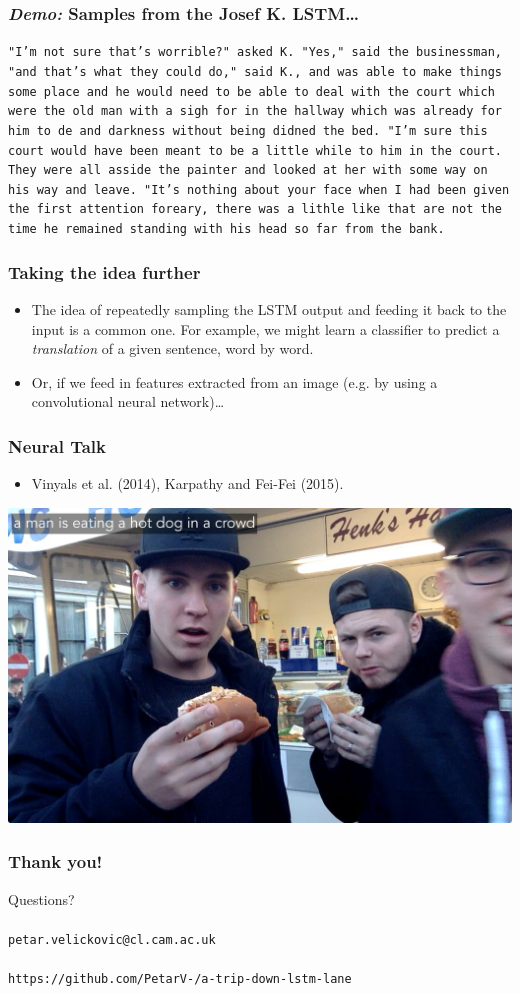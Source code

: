 \documentclass{beamer}
\begin{document}
\begin{frame}
	\frametitle{\emph{Demo:} Samples from the Josef K. LSTM\dots}
	{\tt "I'm not sure that's
worrible?" asked K.  "Yes," said the businessman, "and that's what they could do," said K., and was able to make things some place and he would need to be able to deal with the court which were the old man with a sigh for in the hallway which was already for him to de and darkness without being didned the bed.  "I'm sure this court would have been meant to be a little while to him in the court.  They were all asside the painter and looked at her with some way on his way and leave.  "It's nothing about your face when I had been given the first attention foreary, there was a lithle like that are not the time he remained standing with his head so far from the bank.}
\end{frame}

\begin{frame}
	\frametitle{Taking the idea further}
	\begin{itemize}
		\item The idea of repeatedly sampling the LSTM output and feeding it back to the input is a common one. For example, we might learn a classifier to predict a \emph{translation} of a given sentence, word by word.
		\vfill
		\item Or, if we feed in features extracted from an image (e.g. by using a convolutional neural network)\dots
	\end{itemize}
\end{frame}

\begin{frame}
	\frametitle{Neural Talk}
	\begin{itemize}
		\item Vinyals et al. (2014), Karpathy and Fei-Fei (2015).
	\end{itemize}
	\centering
	\includegraphics[width=0.8\linewidth]{neural_talk.jpg}
\end{frame}

\begin{frame}
	\frametitle{Thank you!}
    \centering
    {\Huge Questions?}\\ \hfill \\
    {\tt \LARGE petar.velickovic@cl.cam.ac.uk}\\ \hfill \\
    {\tt \large https://github.com/PetarV-/a-trip-down-lstm-lane}
\end{frame}
\end{document}
